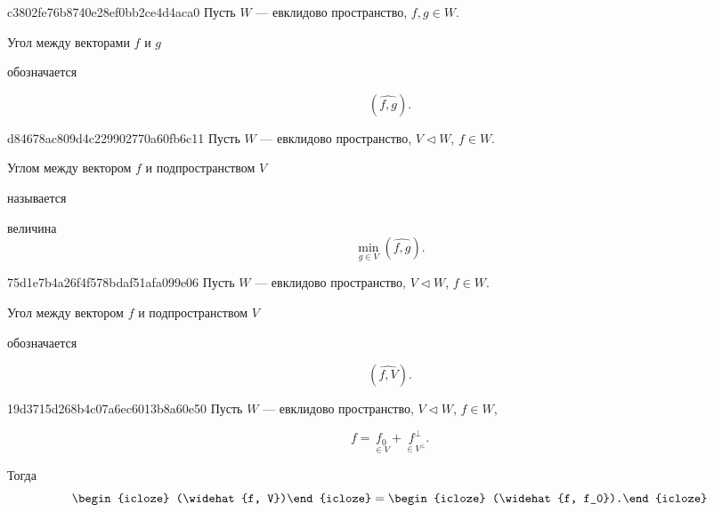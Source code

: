 \begin{note}{c3802fe76b8740e28ef0bb2ce4d4aca0}
    Пусть \({ W }\) --- евклидово пространство, \({ f, g \in W }\).
    \begin{icloze}{2}Угол между векторами \({ f }\) и \({ g }\)\end{icloze} обозначается
    \begin{icloze}{1}
        \[
            (\widehat{f, g}).
        \]
    \end{icloze}
\end{note}

\begin{note}{d84678ac809d4c229902770a60fb6c11}
    Пусть \({ W }\) --- евклидово пространство, \({ V \triangleleft W }\), \({ f \in W }\).
    \begin{icloze}{2}Углом между вектором \({ f }\) и подпространством \({ V }\)\end{icloze} называется \begin{icloze}{1}величина
    \[
        \min_{g \in V} (\widehat{f, g}).
    \]\end{icloze}
\end{note}

\begin{note}{75d1e7b4a26f4f578bdaf51afa099e06}
    Пусть \({ W }\) --- евклидово пространство, \({ V \triangleleft W }\), \({ f \in W }\).
    \begin{icloze}{2}Угол между вектором \({ f }\) и подпространством \({ V }\)\end{icloze} обозначается
    \begin{icloze}{1}
        \[
            (\widehat{f, V}).
        \]
    \end{icloze}
\end{note}

\begin{note}{19d3715d268b4c07a6ec6013b8a60e50}
    Пусть \({ W }\) --- евклидово пространство, \({ V \triangleleft W }\), \({ f \in W }\),
    \begin{icloze}{3}
        \[
            f = \underset{\in V}{f_0} + \underset{\in V^{\perp}}{f^{\perp}}.
        \]
    \end{icloze}
    Тогда
    \[
        \begin{icloze}{2}(\widehat{f, V})\end{icloze} = \begin{icloze}{1}(\widehat{f, f_0}).\end{icloze}
    \]
\end{note}

